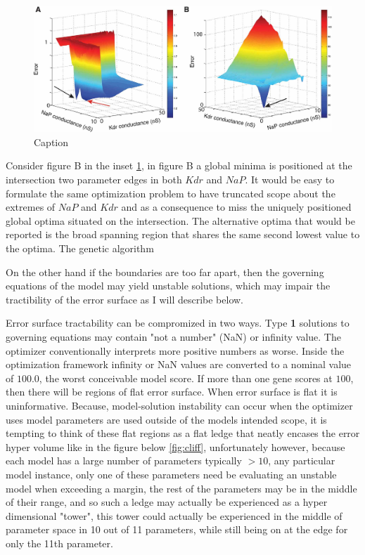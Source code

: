 \begin{figure}
    \centering
    \includegraphics{figures/fninf-01-001-g009.jpg}
    \caption{Caption}
    \label{fig:best_at_edge}
\end{figure}

Consider figure B in the inset \ref{fig:best_at_edge}, in figure B a global minima is positioned at the intersection two parameter edges in both $Kdr$ and $NaP$. It would be easy to formulate the same optimization problem to have truncated scope about the extremes of $NaP$ and $Kdr$ and as a consequence to miss the uniquely positioned global optima situated on the intersection. The alternative optima that would be reported is the broad spanning region that shares the same second lowest value to the optima. The genetic algorithm

On the other hand if the boundaries are too far apart, then the governing equations of the model may yield unstable solutions, which may impair the tractibility of the error surface as I will describe below.

Error surface tractability can be compromized in two ways.
Type \textbf{1} solutions to governing equations may contain "not a number" (NaN) or infinity value. The optimizer conventionally interprets more positive numbers as worse. Inside the optimization framework infinity or NaN values are converted to a nominal value of $100.0$, the worst conceivable model score. If more than one gene scores at $100$, then there will be regions of flat error surface. %
When error surface is flat it is uninformative. 
Because, model-solution instability can occur when the optimizer uses model parameters are used outside of the models intended scope, it is tempting to think of these flat regions as a flat ledge that neatly encases the error hyper volume like in the figure below \ref{fig:cliff}, unfortunately however, because each model has a large number of parameters typically $>10$, any particular model instance, only one of these parameters need be evaluating an unstable model when exceeding a margin, the rest of the parameters may be in the middle of their range, and so such a ledge may actually be experienced as a hyper dimensional "tower", this tower could actually be experienced in the middle of parameter space in 10 out of 11 parameters, while still being on at the edge for only the 11th parameter.


